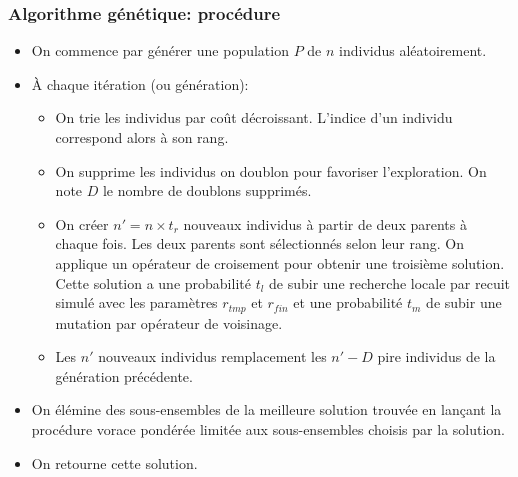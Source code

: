 \documentclass[aspectratio=169,11pt]{beamer}
\begin{document}
	\begin{frame}
		\frametitle{Algorithme génétique: procédure}
		\begin{itemize}
			\item On commence par générer une population \(P\) de \(n\) individus aléatoirement.
			\item À chaque itération (ou génération):
				\begin{itemize}
					\item On trie les individus par coût décroissant. L'indice d'un individu correspond alors à son rang.
					\item On supprime les individus on doublon pour favoriser l'exploration. On note \(D\) le nombre de doublons supprimés.
					\item On créer \(n' = n \times t_r\) nouveaux individus à partir de deux parents à chaque fois.
						Les deux parents sont sélectionnés selon leur rang. On applique un opérateur de croisement
						pour obtenir une troisième solution. Cette solution a une probabilité \(t_l\) de subir une
						recherche locale par recuit simulé avec les paramètres \(r_{tmp}\) et \(r_{fin}\) et une probabilité
						\(t_m\) de subir une mutation par opérateur de voisinage.
					\item Les \(n'\) nouveaux individus remplacement les \(n' - D\) pire individus de la génération précédente.
				\end{itemize}
			\item On élémine des sous-ensembles de la meilleure solution trouvée en lançant la procédure vorace pondérée limitée
				aux sous-ensembles choisis par la solution.
			\item On retourne cette solution.
		\end{itemize}
	\end{frame}

\end{document}

